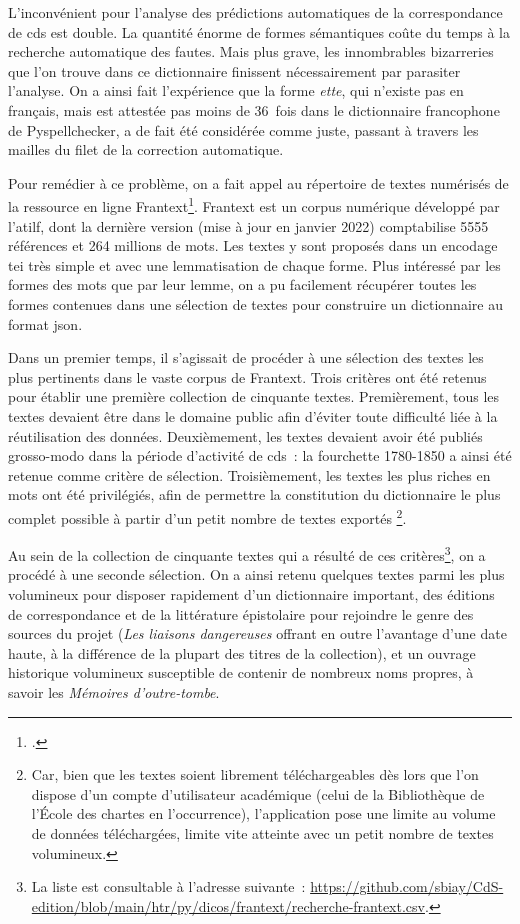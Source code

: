 \documentclass[a4paper,12pt,twoside]{book}
\begin{document}
				L'inconvénient pour l'analyse des \glspl{prédiction} automatiques de la correspondance de \gls{cds} est double. La quantité énorme de formes sémantiques coûte du temps à la recherche automatique des fautes. Mais plus grave, les innombrables bizarreries que l'on trouve dans ce dictionnaire finissent nécessairement par parasiter l'analyse. On a ainsi fait l'expérience que la forme \textit{ette}, qui n'existe pas en français, mais est attestée pas moins de 36~fois dans le dictionnaire francophone de Pyspellchecker, a de fait été considérée comme juste, passant à travers les mailles du filet de la correction automatique.
				
				Pour remédier à ce problème, on a fait appel au répertoire de textes numérisés de la ressource en ligne Frantext\footcite{Frantext}. Frantext est un corpus numérique développé par l'\gls{atilf}, dont la dernière version (mise à jour en janvier 2022) comptabilise 5555 références et 264 millions de mots. Les textes y sont proposés dans un encodage \gls{tei} très simple et avec une lemmatisation de chaque forme. Plus intéressé par les formes des mots que par leur lemme, on a pu facilement récupérer toutes les formes contenues dans une sélection de textes pour construire un dictionnaire au format \gls{json}.
				
				Dans un premier temps, il s'agissait de procéder à une sélection des textes les plus pertinents dans le vaste corpus de Frantext. Trois critères ont été retenus pour établir une première collection de cinquante textes. Premièrement, tous les textes devaient être dans le domaine public afin d'éviter toute difficulté liée à la réutilisation des données. Deuxièmement, les textes devaient avoir été publiés grosso-modo dans la période d'activité de \gls{cds}~: la fourchette 1780-1850 a ainsi été retenue comme critère de sélection. Troisièmement, les textes les plus riches en mots ont été privilégiés, afin de permettre la constitution du dictionnaire le plus complet possible à partir d'un petit nombre de textes exportés
				\footnote{Car, bien que les textes soient librement téléchargeables dès lors que l'on dispose d'un compte d'utilisateur académique (celui de la Bibliothèque de l'École des chartes en l'occurrence), l'application pose une limite au volume de données téléchargées, limite vite atteinte avec un petit nombre de textes volumineux.}. 
				
				Au sein de la collection de cinquante textes qui a résulté de ces critères\footnote{La liste est consultable à l'adresse suivante~: \url{https://github.com/sbiay/CdS-edition/blob/main/htr/py/dicos/frantext/recherche-frantext.csv}.}, on a procédé à une seconde sélection. On a ainsi retenu quelques textes parmi les plus volumineux pour disposer rapidement d'un dictionnaire important, des éditions de correspondance et de la littérature épistolaire pour rejoindre le genre des sources du projet (\textit{Les liaisons dangereuses} offrant en outre l'avantage d'une date haute, à la différence de la plupart des titres de la collection), et un ouvrage historique volumineux susceptible de contenir de nombreux noms propres, à savoir les \textit{Mémoires d'outre-tombe}.
				
\end{document}
